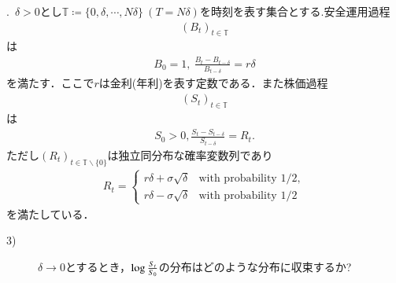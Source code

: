 .\ $\delta > 0$とし$\mathbb{T} \coloneqq \{ 0 ,\delta, \cdots, N\delta \}\ (T = N\delta)$を時刻を表す集合とする.安全運用過程
\begin{align}
	(B_t)_{t \in \mathbb{T}}
\end{align}
は
\begin{align}
	B_0 = 1,\ \frac{B_t - B_{t - \delta}}{B_{t - \delta}} = r \delta
\end{align}
を満たす．ここで$r$は金利(年利)を表す定数である．また株価過程
\begin{align}
	(S_t)_{t \in \mathbb{T}}
\end{align}
は
\begin{align}
	S_0 > 0, \frac{S_t - S_{t - \delta}}{S_{t - \delta}} = R_t.
\end{align}
ただし$(R_t)_{t \in \mathbb{T} \backslash \{0\}}$は独立同分布な確率変数列であり
\begin{align}
	R_t = \begin{cases}
		r \delta + \sigma \sqrt{\delta} & \mbox{with probability } 1/2, \\
		r \delta - \sigma \sqrt{\delta} & \mbox{with probability } 1/2
	\end{cases}
\end{align} 
を満たしている．
\begin{description}
	\item[3)] $\delta \rightarrow 0$とするとき，$\operatorname{log} \frac{S_t}{S_0}$の分布はどのような分布に収束するか?
\end{description}

